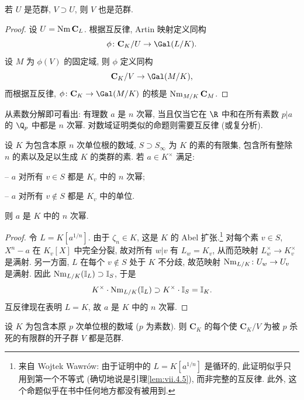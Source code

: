 \begin{lemma}\label{lem:vii.9.1}
若 $U$ 是范群, $V\supset U$, 则 $V$ 也是范群.
\end{lemma}

\begin{proof}
设 $U=\operatorname{Nm}\mathbf{C}_L$. 根据互反律, Artin 映射定义同构
\[
\phi\colon\mathbf{C}_{K}/U\to\Gal(L/K).
\]
设 $M$ 为 $\phi(V)$ 的固定域, 则 $\phi$ 定义同构
\[
\mathbf{C}_{K}/V\to\Gal(M/K),
\]
而根据互反律, $\phi\colon\mathbf{C}_K\to\Gal(M/K)$ 的核是 $\operatorname{Nm}_{M/K}\mathbf{C}_M$.
\end{proof}

从素数分解即可看出: 有理数 $a$ 是 $n$ 次幂, 当且仅当它在 $\R$ 中和在所有素数 $p|a$ 的 $\Q_p$ 中都是 $n$ 次幂. 对数域证明类似的命题则需要互反律 (或复分析).

\begin{proposition}\label{prop:vii.9.2}
设 $K$ 为包含本原 $n$ 次单位根的数域, $S\supset S_{\infty}$ 为 $K$ 的素的有限集, 包含所有整除 $n$ 的素以及足以生成 $K$ 的类群的素. 若 $a\in K^{\times}$ 满足:

-- $a$ 对所有 $v\in S$ 都是 $K_v$ 中的 $n$ 次幂;

-- $a$ 对所有 $v\notin S$ 都是 $K_v$ 中的单位.

则 $a$ 是 $K$ 中的 $n$ 次幂.
\end{proposition}

\begin{proof}
令 $L=K[a^{1/n}]$. 由于 $\zeta_n\in K$, 这是 $K$ 的 Abel 扩张.\footnote{来自 Wojtek Wawr\'ow: 由于证明中的 $L=K[a^{1/n}]$ 是循环的, 此证明似乎只用到第一个不等式 (确切地说是引理\ref{lem:vii.4.5}), 而非完整的互反律. 此外, 这个命题似乎在书中任何地方都没有被用到.} 对每个素 $v\in S$, $X^{n}-a$ 在 $K_v[X]$ 中完全分裂, 故对所有 $w|v$ 有 $L_w=K_v$, 从而范映射 $L_{w}^{\times}\to K_{v}^{\times}$ 是满射. 另一方面, $L$ 在每个 $v\notin S$ 处于 $K$ 不分歧, 故范映射 $\operatorname{Nm}_{L/K}\colon U_w\to U_v$ 是满射. 因此 $\operatorname{Nm}_{L/K}(\mathbb{I}_L)\supset\mathbb{I}_S$, 于是
\[
K^{\times}\cdot\operatorname{Nm}_{L/K}(\mathbb{I}_{L})\supset K^{\times}\cdot\mathbb{I}_{S}=\mathbb{I}_{K}.
\]
互反律现在表明 $L=K$, 故 $a$ 是 $K$ 中的 $n$ 次幂.
\end{proof}

\begin{lemma}[存在定理的关键情形]\label{lem:vii.9.3}
设 $K$ 为包含本原 $p$ 次单位根的数域 ($p$ 为素数). 则 $\mathbf{C}_K$ 的每个使 $\mathbf{C}_K/V$ 为被 $p$ 杀死的有限群的开子群 $V$ 都是范群.
\end{lemma}

